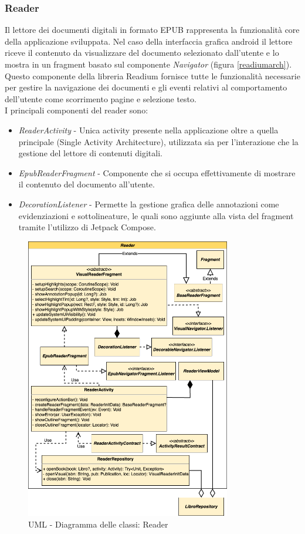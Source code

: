 \subsubsection{Reader}
Il lettore dei documenti digitali in formato EPUB rappresenta la funzionalità core della applicazione sviluppata. Nel caso della interfaccia grafica android il lettore riceve il contenuto da visualizzare del documento selezionato dall'utente e lo mostra in un fragment basato sul componente \textit{Navigator} (figura \ref{readiumarch}). Questo componente della libreria Readium fornisce tutte le funzionalità necessarie per gestire la navigazione dei documenti e gli eventi relativi al comportamento dell'utente come scorrimento pagine e selezione testo. \\
I principali componenti del reader sono:
\begin{itemize}
    \item \textit{ReaderActivity} - Unica activity presente nella applicazione oltre a quella principale (Single Activity Architecture), utilizzata sia per l’interazione che la gestione del lettore di contenuti digitali.
    \item \textit{EpubReaderFragment} - Componente che si occupa effettivamente di mostrare il contenuto del documento all'utente.
    \item \textit{DecorationListener} - Permette la gestione grafica delle annotazioni come evidenziazioni e sottolineature, le quali sono aggiunte alla vista del fragment tramite l'utilizzo di Jetpack Compose.
\end{itemize}

\begin{figure}[H]
\centering
\includegraphics[width=0.8\textwidth]{img/tesi-2-Page-16.drawio.png}
\caption{UML - Diagramma delle classi: Reader}
\label{reader}
\end{figure}

